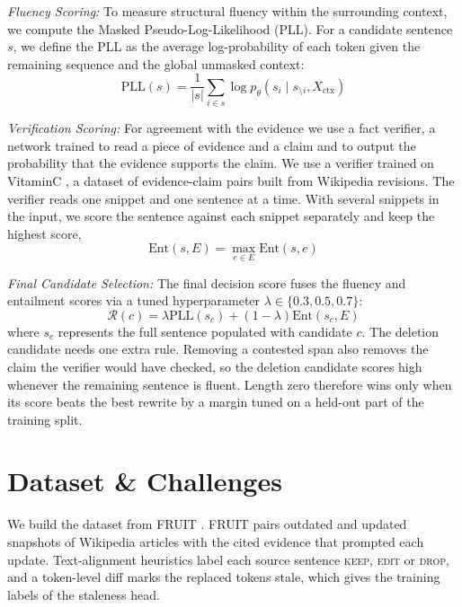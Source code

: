 \documentclass[11pt]{article}
\newcommand{\keep}{\textsc{keep}}
\newcommand{\edit}{\textsc{edit}}
\newcommand{\drop}{\textsc{drop}}
\begin{document}
        \emph{Fluency Scoring:}
        To measure structural fluency within the surrounding context, we compute the Masked Pseudo-Log-Likelihood (PLL). For a candidate sentence $s$, we define the PLL as the average log-probability of each token given the remaining sequence and the global unmasked context:
        \begin{equation}
            \text{PLL}(s) = \frac{1}{|s|} \sum_{i \in s} \log p_\theta(s_i \mid s_{\setminus i}, X_{\text{ctx}})
        \end{equation}

        \emph{Verification Scoring:} 
        For agreement with the evidence we use a fact verifier, a network trained to read a piece of evidence and a claim and to output the probability that the evidence supports the claim. We use a verifier trained on VitaminC \citep{schuster-etal-2021-vitaminc}, a dataset of evidence-claim pairs built from Wikipedia revisions. The verifier reads one snippet and one sentence at a time. With several snippets in the input, we score the sentence against each snippet separately and keep the highest score,
            \begin{equation}
                \text{Ent}(s, E) = \max_{e \in E} \text{Ent}(s, e)
            \end{equation}

        \emph{Final Candidate Selection:}
        The final decision score fuses the fluency and entailment scores via a tuned hyperparameter $\lambda \in \{0.3, 0.5, 0.7\}$:
        \begin{equation}
            \mathcal{R}(c) = \lambda \text{PLL}(s_c) + (1 - \lambda) \text{Ent}(s_c, E)
        \end{equation}
        where $s_c$ represents the full sentence populated with candidate $c$. The deletion candidate needs one extra rule. Removing a contested span also removes the claim the verifier would have checked, so the deletion candidate scores high whenever the remaining sentence is fluent. Length zero therefore wins only when its score beats the best rewrite by a margin tuned on a held-out part of the training split.     

\section{Dataset \& Challenges}
\label{sec:dataset}
    We build the dataset from FRUIT \citep{iv-etal-2022-fruit}. FRUIT pairs outdated and updated snapshots of Wikipedia articles with the cited evidence that prompted each update. Text-alignment heuristics label each source sentence \keep{}, \edit{} or \drop{}, and a token-level diff marks the replaced tokens stale, which gives the training labels of the staleness head.
\end{document}
